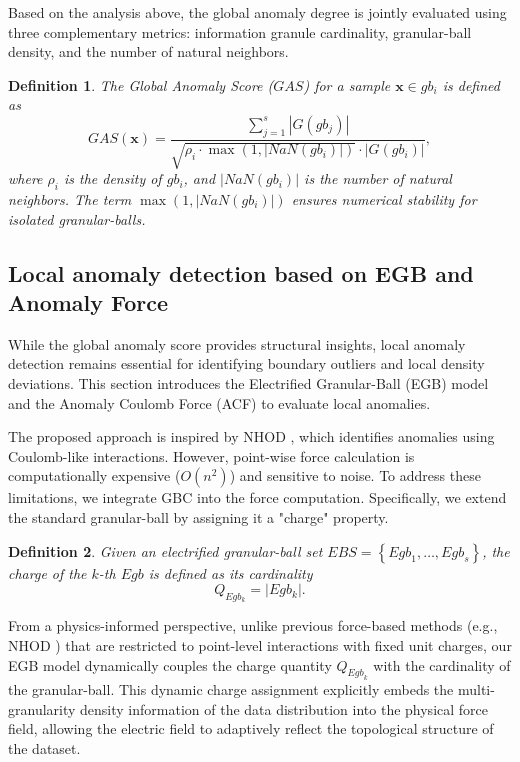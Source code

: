 \documentclass[times, review, 10pt]{elsarticle}
\newtheorem{definition}{Definition}
\begin{document}
Based on the analysis above, the global anomaly degree is jointly evaluated using three complementary metrics: information granule cardinality, granular-ball density, and the number of natural neighbors.

\begin{definition}
The Global Anomaly Score ($GAS$) for a sample $\boldsymbol{x} \in gb_i$ is defined as
\begin{equation}
    GAS(\boldsymbol{x}) = {\frac{\sum_{j=1}^{s}|G(gb_j)|}{\sqrt{\rho_{i} \cdot \max(1, |NaN(gb_i)|)} \cdot |G(gb_i)|  }},
    \label{eq:coarse-grained degree}
\end{equation}
where $\rho_i$ is the density of $gb_i$, and $|NaN(gb_i)|$ is the number of natural neighbors. The term $\max(1, |NaN(gb_i)|)$ ensures numerical stability for isolated granular-balls.
\end{definition}

\subsection{Local anomaly detection based on EGB and Anomaly Force}

While the global anomaly score provides structural insights, local anomaly detection remains essential for identifying boundary outliers and local density deviations. This section introduces the Electrified Granular-Ball (EGB) model and the Anomaly Coulomb Force (ACF) to evaluate local anomalies.

The proposed approach is inspired by NHOD \cite{zhu2022high}, which identifies anomalies using Coulomb-like interactions. However, point-wise force calculation is computationally expensive ($O(n^2)$) and sensitive to noise. To address these limitations, we integrate GBC into the force computation.
{Specifically, we extend the standard granular-ball by assigning it a "charge" property.}

\begin{definition}
Given an electrified granular-ball set $EBS=\left\{{Egb}_1, \ldots, {Egb}_{{s}}\right\}$, the charge of the $k$-th $Egb$ is defined as its cardinality
\begin{equation}
    Q_{Egb_k} = |Egb_k|.
\end{equation}
\end{definition}

{From a physics-informed perspective, unlike previous force-based methods (e.g., NHOD \cite{zhu2022high}) that are restricted to point-level interactions with fixed unit charges, our EGB model dynamically couples the charge quantity $Q_{{Egb}_k}$ with the cardinality of the granular-ball. This dynamic charge assignment explicitly embeds the multi-granularity density information of the data distribution into the physical force field, allowing the electric field to adaptively reflect the topological structure of the dataset.}
\end{document}
